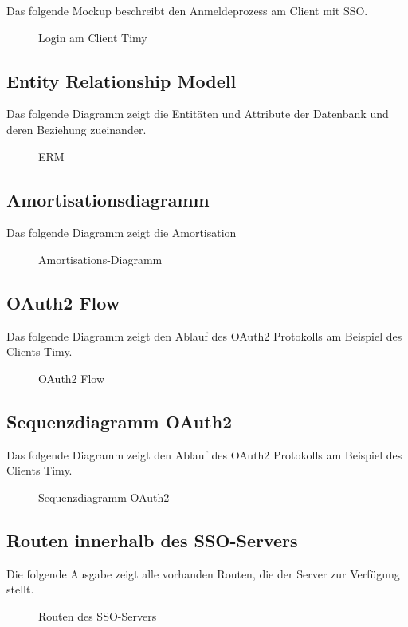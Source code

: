 Das folgende Mockup beschreibt den Anmeldeprozess am Client mit \acs{SSO}.
\begin{figure}[htb]
\centering
{}
\caption{Login am Client Timy}
\end{figure}
\clearpage

\subsection{Entity Relationship Modell}
\label{app:ERM}
Das folgende Diagramm zeigt die Entitäten und Attribute der Datenbank und deren Beziehung zueinander.
\begin{figure}[htb]
\centering
{}
\caption{ERM}
\end{figure}
\clearpage

\subsection{Amortisationsdiagramm}
\label{app:Amortisationsdiagramm}
Das folgende Diagramm zeigt die Amortisation
\begin{figure}[htb]
\centering
{}
\caption{Amortisations-Diagramm}
\end{figure}
\clearpage

\subsection{OAuth2 Flow}
\label{app:oauth2flow}
Das folgende Diagramm zeigt den Ablauf des OAuth2 Protokolls am Beispiel des Clients Timy.
\begin{figure}[htb]
\centering
{}
\caption{OAuth2 Flow}
\end{figure}
\clearpage

\subsection{Sequenzdiagramm OAuth2}
\label{app:sequenzdiagramm}
Das folgende Diagramm zeigt den Ablauf des OAuth2 Protokolls am Beispiel des Clients Timy.
\begin{figure}[htb]
\centering
{}
\caption{Sequenzdiagramm OAuth2}
\end{figure}
\clearpage



\subsection{Routen innerhalb des SSO-Servers}
\label{app:routes}
Die folgende Ausgabe zeigt alle vorhanden Routen, die der Server zur Verfügung stellt.
\begin{figure}[htb]
\centering
{}
\caption{Routen des SSO-Servers}
\end{figure}
\clearpage

